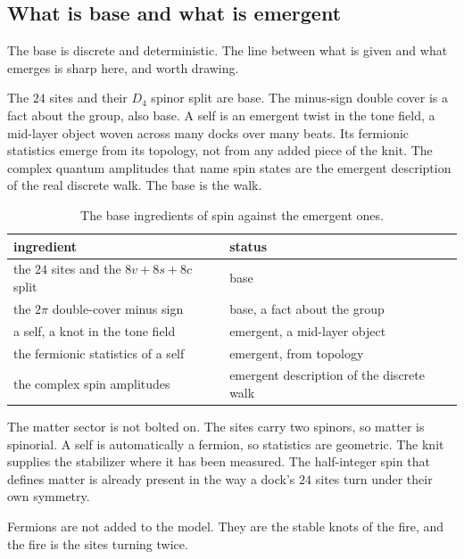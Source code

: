 \subsection{What is base and what is emergent}

The base is discrete and deterministic. The line between what is given and what emerges is sharp here, and worth
drawing.

The $24$ sites and their $D_4$ spinor split are base. The minus-sign double cover is a fact about the group, also
base. A self is an emergent twist in the tone field, a mid-layer object woven across many docks over many beats.
Its fermionic statistics emerge from its topology, not from any added piece of the knit. The complex quantum
amplitudes that name spin states are the emergent description of the real discrete walk. The base is the walk.

\begin{table}[ht]
\centering
\begin{tabular}{@{}ll@{}}
\toprule
ingredient & status \\
\midrule
the $24$ sites and the $8v + 8s + 8c$ split & base \\
the $2\pi$ double-cover minus sign & base, a fact about the group \\
a self, a knot in the tone field & emergent, a mid-layer object \\
the fermionic statistics of a self & emergent, from topology \\
the complex spin amplitudes & emergent description of the discrete walk \\
\bottomrule
\end{tabular}
\caption{The base ingredients of spin against the emergent ones.}
\label{tab:base-vs-emergent}
\end{table}

The matter sector is not bolted on. The sites carry two spinors, so matter is spinorial. A self is automatically
a fermion, so statistics are geometric. The knit supplies the stabilizer where it has been measured. The
half-integer spin that defines matter is already present in the way a dock's $24$ sites turn under their own
symmetry.

\begin{result}
Fermions are not added to the model. They are the stable knots of the fire, and the fire is the sites turning
twice.
\end{result}
